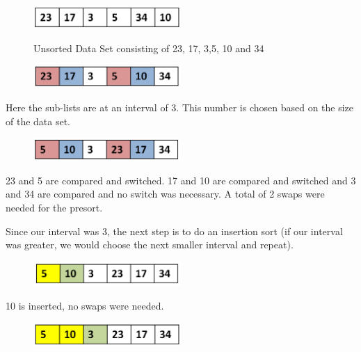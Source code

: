 \begin{figure}[H]
\centering
\includegraphics[width=0.5\textwidth]{pictures/shell1.png}
\label{fig:shell1}
\caption{Unsorted Data Set consisting of 23, 17, 3,5, 10 and 34}
\end{figure}

\begin{figure}[H]
\centering
\includegraphics[width=0.5\textwidth]{pictures/shell2.png}
\label{fig:shell2}
\end{figure}

Here the sub-lists are at an interval of 3. This number is chosen based on the size of the data set.  

\begin{figure}[H]
\centering
\includegraphics[width=0.5\textwidth]{pictures/shell3.png}
\label{fig:shell3}
\end{figure}

23 and 5 are compared and switched. 17 and 10 are compared and switched and 3 and 34 are compared and no switch was necessary. A total of 2 swaps were needed for the presort.

Since our interval was 3, the next step is to do an insertion sort (if our interval was greater, we would choose the next smaller interval and repeat).

\begin{figure}[H]
\centering
\includegraphics[width=0.5\textwidth]{pictures/shell4.png}
\label{fig:shell4}
\end{figure}

10 is inserted, no swaps were needed.

\begin{figure}[H]
\centering
\includegraphics[width=0.5\textwidth]{pictures/shell5.png}
\label{fig:shell5}
\end{figure}

